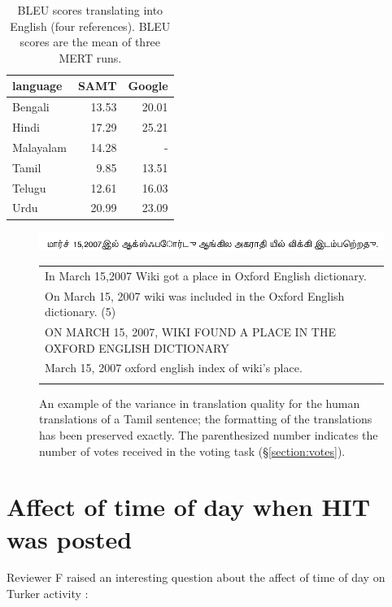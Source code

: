 \documentclass[11pt]{article}
\begin{document}
\begin{table}[t]
\centering
\begin{tabular}{l|rr}
  language  & SAMT &  Google \\
  \hline\hline
  Bengali    & 13.53  &  20.01 \\
  Hindi      & 17.29  & 25.21 \\  
  Malayalam    & 14.28  & - \\      
  Tamil      &  9.85  &  13.51 \\  
  Telugu     & 12.61  & 16.03  \\  
  Urdu        & 20.99  & 23.09 \\   
\end{tabular}
\caption{BLEU scores translating into English (four references).  BLEU
scores are the mean of three MERT runs.}
\label{table:bleu}
\end{table}

\begin{figure}[t]
  \centering
  \includegraphics[width=\textwidth]{figures/tamil.png}
  \begin{tabular}{l}
    \hline
    In March 15,2007 Wiki got a place in Oxford English dictionary. \\
    On March 15, 2007 wiki was included in the Oxford English
    dictionary. (5) \\
    ON MARCH 15, 2007, WIKI FOUND A PLACE IN THE OXFORD ENGLISH
    DICTIONARY \\
    March 15, 2007 oxford english index of wiki's place. \\ \\

  \end{tabular}
  \caption{An example of the variance in translation quality for the
    human translations of a Tamil sentence; the formatting of the
    translations has been preserved exactly.  The parenthesized number
    indicates the number of votes received in the voting task
    (\S\ref{section:votes}).}
  \label{figure:variance}
\end{figure}

\section{Affect of time of day when HIT was posted}

Reviewer F raised an interesting question about the affect of time of day on Turker activity : 
\end{document}
